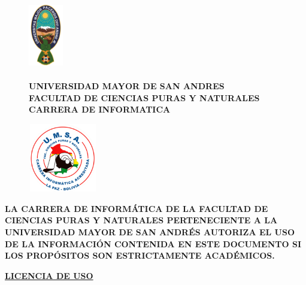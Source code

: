 \newpage
\begin{figure}[h]
    \centering
    \begin{minipage}{0.1\textwidth}
        \begin{flushleft}
        \includegraphics[width=1.5cm,height=3cm]{images/logo_umsa.png}
        \end{flushleft}
    \end{minipage}%
    \begin{minipage}{0.8\textwidth}
        \centering
        \textbf{
            UNIVERSIDAD MAYOR DE SAN ANDRES\\
            FACULTAD DE CIENCIAS PURAS Y NATURALES\\
            CARRERA DE INFORMATICA\\[1cm]
        }
    \end{minipage}%
    \begin{minipage}{0.1\textwidth}
        \begin{flushright}
        \includegraphics[width=3cm,height=3cm]{images/logo_info.png} 
        \end{flushright}
    \end{minipage}
\end{figure}

\begin{justify}
    \textbf{
LA CARRERA DE INFORMÁTICA DE LA FACULTAD DE CIENCIAS PURAS Y NATURALES 
PERTENECIENTE A LA UNIVERSIDAD MAYOR DE SAN ANDRÉS AUTORIZA EL USO DE LA 
INFORMACIÓN CONTENIDA EN ESTE DOCUMENTO SI LOS 
PROPÓSITOS SON ESTRICTAMENTE ACADÉMICOS.
    }\\[1cm]
\end{justify}


\begin{center}
    \underline{\textbf{LICENCIA DE USO}}
\end{center}

